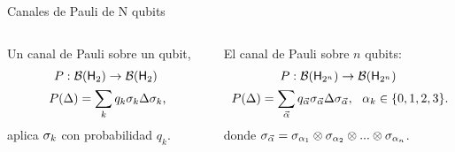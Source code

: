 \begin{frame}{Canales de Pauli de N qubits}
    \begin{columns}
        \begin{column}{0.5\textwidth}
            Un canal de Pauli sobre un qubit,
            \begin{equation}
                \begin{gathered}
                P:\mcB(\hilbert_{2}) \rightarrow \mcB(\hilbert_{2})\nonumber\pause\\
                P(\Delta)=\sum_{k}q_{k}\pauli{k}\Delta\pauli{k} \rlap{,}
                \end{gathered}
            \end{equation}\pause
            aplica $\sigma_{k}$ con probabilidad $q_{k}$.
        \end{column}
        \pause
        \begin{column}{0.5\textwidth}
            El canal de Pauli sobre $n$ qubits:
            \begin{equation}
                \begin{gathered}
                P:\mcB(\hilbert_{2^{n}}) \rightarrow \mcB(\hilbert_{2^{n}})\nonumber\pause\\
                P(\Delta)=\sum_{\vec{\alpha}}q_{\vec{\alpha}}\pauli{\vec{\alpha}}\Delta\pauli{\vec{\alpha}},\pause \,\text{ }\, \alpha_{k}\in\{0,1,2,3\} \rlap{.}
                \end{gathered}
            \end{equation}\pause
            donde  $\sigma_{\vec{\alpha}}=\sigma_{\alpha_{1}}\otimes\sigma_{\alpha_{2}}\otimes...\otimes \sigma_{\alpha_{n}}$.
        \end{column}
    \end{columns}
\end{frame}

